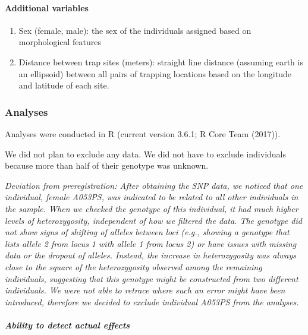 \documentclass[]{article}
\let\oldparagraph\paragraph
\renewcommand{\paragraph}[1]{\oldparagraph{#1}\mbox{}}
\begin{document}
\hypertarget{additional-variables}{%
\paragraph{Additional variables}\label{additional-variables}}

\begin{enumerate}
\def\labelenumi{\arabic{enumi})}
\item
  Sex (female, male): the sex of the individuals assigned based on
  morphological features
\item
  Distance between trap sites (meters): straight line distance (assuming
  earth is an ellipsoid) between all pairs of trapping locations based
  on the longitude and latitude of each site.
\end{enumerate}

\hypertarget{analyses}{%
\subsubsection{Analyses}\label{analyses}}

Analyses were conducted in R (current version 3.6.1; R Core Team
(2017)).

We did not plan to exclude any data. We did not have to exclude
individuals because more than half of their genotype was unknown.

\emph{Deviation from preregistration: After obtaining the SNP data, we
noticed that one individual, female A053PS, was indicated to be related
to all other individuals in the sample. When we checked the genotype of
this individual, it had much higher levels of heterozygosity,
independent of how we filtered the data. The genotype did not show signs
of shifting of alleles between loci (e.g., showing a genotype that lists
allele 2 from locus 1 with allele 1 from locus 2) or have issues with
missing data or the dropout of alleles. Instead, the increase in
heterozygosity was always close to the square of the heterozygosity
observed among the remaining individuals, suggesting that this genotype
might be constructed from two different individuals. We were not able to
retrace where such an error might have been introduced, therefore we
decided to exclude individual A053PS from the analyses.}

\hypertarget{ability-to-detect-actual-effects}{%
\paragraph{\texorpdfstring{\emph{Ability to detect actual
effects}}{Ability to detect actual effects}}\label{ability-to-detect-actual-effects}}
\end{document}

